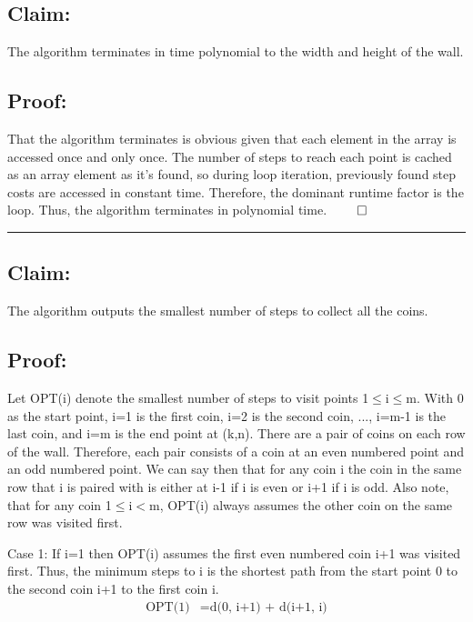 \documentclass[11pt]{article}
\begin{document}
\subsection*{Claim:}

The algorithm terminates in time polynomial to the width and height of the wall. 

\subsection*{Proof:}

That the algorithm terminates is obvious given that each element in the array is accessed once and only once. The number of steps to reach each point is cached as an array element as it's found, so during loop iteration, previously found step costs are accessed in constant time. Therefore, the dominant runtime factor is the loop. Thus, the algorithm terminates in polynomial time. $\qed$

\noindent\textcolor[RGB]{220,220,220}{\rule{\linewidth}{0.8pt}}

\subsection*{Claim:}

The algorithm outputs the smallest number of steps to collect all the coins.  

\subsection*{Proof:}

Let OPT(i) denote the smallest number of steps to visit points 1$\leq$i$\leq$m. With 0 as the start point, i=1 is the first coin, i=2 is the second coin, ..., i=m-1 is the last coin, and i=m is the end point at (k,n). There are a pair of coins on each row of the wall. Therefore, each pair consists of a coin at an even numbered point and an odd numbered point. We can say then that for any coin i the coin in the same row that i is paired with is either at i-1 if i is even or i+1 if i is odd. Also note, that for any coin 1$\leq$i$<$m, OPT(i) always assumes the other coin on the same row was visited first. 

Case 1: If i=1 then OPT(i) assumes the first even numbered coin i+1 was visited first. Thus, the minimum steps to i is the shortest path from the start point 0 to the second coin i+1 to the first coin i.
\begin{align*}
\text{OPT(1)} &= \text{d(0, i+1) + d(i+1, i)}
\end{align*}
\end{document}

